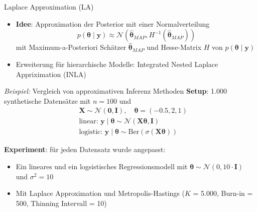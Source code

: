 \documentclass[
  ignorenonframetext,
  aspectratio=169,
]{beamer}
\providecommand{\tightlist}{%
  \setlength{\itemsep}{0pt}\setlength{\parskip}{0pt}}
\newcommand{\bnull}{\bm{0}}
\newcommand{\by}{\bm{y}}
\newcommand{\bI}{\bm{I}}
\newcommand{\bX}{\bm{X}}
\newcommand{\Ncal}{\mathcal{N}}
\newcommand{\ssd}{\sigma^2}
\newcommand{\btheta}{\bm{\theta}}
\newcommand{\hbtheta}{\hat{\bm{\theta}}}
\begin{document}
\begin{frame}{Laplace Approximation (LA)
\autocite{tierney_accurate_1986}}
\protect{}\label{laplace-approximation-la-tierney_accurate_1986}
\begin{itemize}
\tightlist
\item
  \textbf{Idee}: Approximation der Posterior mit einer Normalverteilung
  \[
  p(\btheta \mid \by) \approx \Ncal(\hbtheta_{MAP}, H^{-1}(\hbtheta_{MAP}))
  \] mit Maximum-a-Posteriori Schätzer \(\hbtheta_{MAP}\) und
  Hesse-Matrix \(H\) von \(p(\btheta \mid \by)\)
\item
  Erweiterung für hierarchische Modelle: Integrated Nested Laplace
  Appriximation (INLA) \autocite{rue_approximate_2009}
\end{itemize}
\end{frame}

\begin{frame}{\emph{Beispiel:} Vergleich von approximativen Inferenz
Methoden}
\protect{}\label{beispiel-vergleich-von-approximativen-inferenz-methoden}
\textbf{Setup}: 1.000 synthetische Datensätze mit \(n=100\) und \[
\begin{aligned}
    &\bX \sim \Ncal(\bnull, \bI), \quad \btheta = (-0.5, 2, 1)\\
    &\text{linear: } \by \mid \btheta \sim \Ncal(\bX \btheta, \bI)\\
    &\text{logistic: } \by \mid \btheta \sim \text{Ber}(\sigma(\bX \btheta))
\end{aligned}
\]

\textbf{Experiment}: für jeden Datensatz wurde angepasst:

\begin{itemize}
\tightlist
\item
  Ein lineares und ein logsistisches Regressionsmodell mit
  \(\btheta \sim \Ncal(0, 10 \cdot \bI)\) und \(\ssd = 10\)
\item
  Mit Laplace Approximation und Metropolis-Hastings (\(K\) = 5.000,
  Burn-in = 500, Thinning Intervall = 10)
\end{itemize}
\end{frame}
\end{document}
